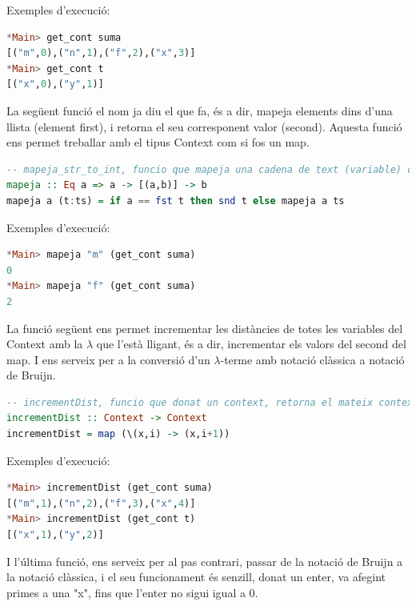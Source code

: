 \documentclass[10pt,a4paper]{article}
\begin{document}
Exemples d'execució:

\begin{lstlisting}[language=Haskell]
*Main> get_cont suma
[("m",0),("n",1),("f",2),("x",3)]
*Main> get_cont t
[("x",0),("y",1)]
\end{lstlisting}

La següent funció el nom ja diu el que fa, és a dir, mapeja elements dins d'una llista (element first), i retorna el seu corresponent valor (second). Aquesta funció ens permet treballar amb el tipus Context com si fos un map.

\begin{lstlisting}[language=Haskell]
-- mapeja_str_to_int, funcio que mapeja una cadena de text (variable) cap a un enter (posicio o distancia en lambdes)
mapeja :: Eq a => a -> [(a,b)] -> b
mapeja a (t:ts) = if a == fst t then snd t else mapeja a ts
\end{lstlisting}

Exemples d'execució:

\begin{lstlisting}[language=Haskell]
*Main> mapeja "m" (get_cont suma)
0
*Main> mapeja "f" (get_cont suma)
2
\end{lstlisting}

La funció següent ens permet incrementar les distàncies de totes les variables del Context amb la $\lambda$ que l'està lligant, és a dir, incrementar els valors del second del map. I ens serveix per a la conversió d'un $\lambda$-terme amb notació clàssica a notació de Bruijn.

\begin{lstlisting}[language=Haskell]
-- incrementDist, funcio que donat un context, retorna el mateix context al que se li han incrementat les distancies de cada variable
incrementDist :: Context -> Context
incrementDist = map (\(x,i) -> (x,i+1))
\end{lstlisting}

Exemples d'execució:

\begin{lstlisting}[language=Haskell]
*Main> incrementDist (get_cont suma)
[("m",1),("n",2),("f",3),("x",4)]
*Main> incrementDist (get_cont t)
[("x",1),("y",2)]
\end{lstlisting}

I l'última funció, ens serveix per al pas contrari, passar de la notació de Bruijn a la notació clàssica, i el seu funcionament és senzill, donat un enter, va afegint primes a una "x", fins que l'enter no sigui igual a 0.
\end{document}
